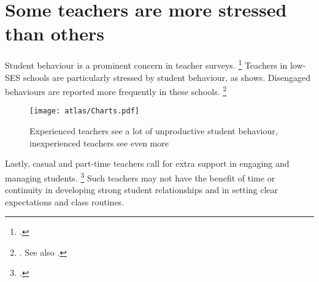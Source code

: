 \documentclass{grattan}
\begin{document}
\section{Some teachers are more stressed than others}\label{sec:more-stressed-than-others}
Student behaviour is a prominent concern in teacher surveys.%
    \footcites{Buchanan2013TeacherRetentionAttrition}{Feltoe2013ComparingTeacherStress}{Richards2012TeacherStressCoping}{Stoughton2007HowWillI}
Teachers in low-SES schools are particularly stressed by student behaviour, as  shows.
Disengaged behaviours are reported more frequently in these schools.%
    \footnote{\textcite{Sullivan2014PunishThemEngage}. See also .}

\begin{figure}
\caption{Experienced teachers see a lot of unproductive student behaviour, inexperienced teachers see even more\label{fig:all-teachers-experience-unproductive-behaviour}}%
\texttt{[image: atlas/Charts.pdf]}
%
\end{figure}

\citetrackerfalse
{}

Lastly, casual and part-time teachers call for extra support in engaging and managing students.%
    \footcites{Buchanan2013TeacherRetentionAttrition}{TEMAG2016ActionNowClassroom}{Mayer2014LongitudinalTeacherEducation}
Such teachers may not have the benefit of time or continuity in developing strong student relationships and in setting clear expectations and class routines.
\end{document}
